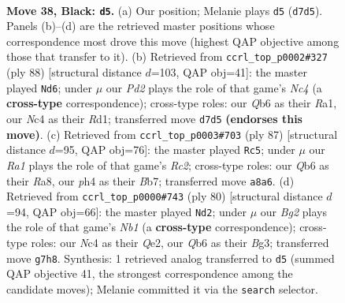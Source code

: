 \documentclass[11pt]{article}
\begin{document}
\clearpage

\begin{figure}[p]\centering
\begin{subfigure}{0.46\textwidth}\centering
\resizebox{\linewidth}{!}{%
\newchessgame
\chessboard[
  setfen={r1b1k3/3p2bp/1q2p3/p4pB1/P1np3P/5NQ1/1P3P2/RN1R1K2 b - - 1 38},
  showmover=false,
  pgfstyle=straightmove, color=movearrow, markmove={d7-d5}
]}
\caption{}
\end{subfigure}\hfill
\begin{subfigure}{0.46\textwidth}\centering
\resizebox{\linewidth}{!}{%
\newchessgame
\chessboard[
  setfen={4q1k1/r1r1npp1/2b1p2p/2P1P3/p1N2P2/7P/1B3QPK/R2R4 w - - 0 45},
  showmover=false,
  pgfstyle=straightmove, color=movearrow, markmove={c4-d6}
]}
\caption{}
\end{subfigure}
\\[4pt]
\begin{subfigure}{0.46\textwidth}\centering
\resizebox{\linewidth}{!}{%
\newchessgame
\chessboard[
  setfen={r5k1/1br2p2/1p3qp1/1B1pn2p/PN1Nn3/4P2P/5PP1/RR2Q1K1 b - - 21 44},
  showmover=false,
  pgfstyle=straightmove, color=movearrow, markmove={c7-c5}
]}
\caption{}
\end{subfigure}\hfill
\begin{subfigure}{0.46\textwidth}\centering
\resizebox{\linewidth}{!}{%
\newchessgame
\chessboard[
  setfen={1b2br1k/1p1nq3/p3p2P/4p1p1/4P1N1/PP4B1/4QPK1/1NR5 w - - 3 41},
  showmover=false,
  pgfstyle=straightmove, color=movearrow, markmove={b1-d2}
]}
\caption{}
\end{subfigure}
\caption{\textbf{Move 38, Black: \texttt{d5}.} (a) Our position; Melanie plays \texttt{d5} (\texttt{d7d5}). Panels (b)--(d) are the retrieved master positions whose correspondence most drove this move (highest QAP objective among those that transfer to it). (b) Retrieved from \texttt{ccrl\_top\_p0002\#327} (ply 88) [structural distance $d$=103, QAP obj=41]: the master played \texttt{Nd6}; under $\mu$ our \emph{Pd2} plays the role of that game's \emph{Nc4} (a \textbf{cross-type} correspondence); cross-type roles: our \emph{Q}b6 as their \emph{R}a1, our \emph{N}c4 as their \emph{R}d1; transferred move \texttt{d7d5} \textbf{(endorses this move)}. (c) Retrieved from \texttt{ccrl\_top\_p0003\#703} (ply 87) [structural distance $d$=95, QAP obj=76]: the master played \texttt{Rc5}; under $\mu$ our \emph{Ra1} plays the role of that game's \emph{Rc2}; cross-type roles: our \emph{Q}b6 as their \emph{R}a8, our \emph{p}h4 as their \emph{B}b7; transferred move \texttt{a8a6}. (d) Retrieved from \texttt{ccrl\_top\_p0000\#743} (ply 80) [structural distance $d$=94, QAP obj=66]: the master played \texttt{Nd2}; under $\mu$ our \emph{Bg2} plays the role of that game's \emph{Nb1} (a \textbf{cross-type} correspondence); cross-type roles: our \emph{N}c4 as their \emph{Q}e2, our \emph{Q}b6 as their \emph{B}g3; transferred move \texttt{g7h8}. Synthesis: 1 retrieved analog transferred to \texttt{d5} (summed QAP objective 41, the strongest correspondence among the candidate moves); Melanie committed it via the \texttt{search} selector.}
\label{fig:thought-m75}
\end{figure}
\end{document}
